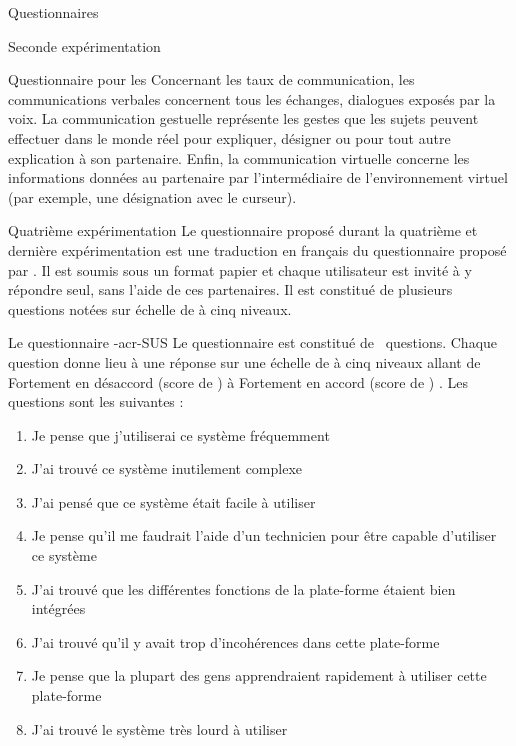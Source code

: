 \documentclass[myfrancais]{mythesis}
\begin{document}
\begin{mychapter}{Questionnaires}
\begin{mysection}{Seconde expérimentation}
\begin{mysubsection}{Questionnaire pour les }
				Concernant les taux de communication, les communications verbales concernent tous les échanges, dialogues exposés par la voix.
				La communication gestuelle représente les gestes que les sujets peuvent effectuer dans le monde réel pour expliquer, désigner ou pour tout autre explication à son partenaire.
				Enfin, la communication virtuelle concerne les informations données au partenaire par l'intermédiaire de l'environnement virtuel (par exemple, une désignation avec le curseur).
			\end{mysubsection}
		\end{mysection}
		\begin{mysection}{Quatrième expérimentation}
			Le questionnaire proposé durant la quatrième et dernière expérimentation est une traduction en français du questionnaire  proposé par .
			Il est soumis sous un format papier et chaque utilisateur est invité à y répondre seul, sans l'aide de ces partenaires.
			Il est constitué de plusieurs questions notées sur échelle de  à cinq niveaux.
			\begin{mysubsection}{Le questionnaire \myacronl-{acr-SUS}}
				Le questionnaire  est constitué de ~questions.
				Chaque question donne lieu à une réponse sur une échelle de  à cinq niveaux allant de \og Fortement en désaccord (score de ) \fg à \og Fortement en accord (score de ) \fg.
				Les questions sont les suivantes :
				\begin{enumerate}[label={Q\arabic*.},ref={Q\arabic*}]
					\item Je pense que j'utiliserai ce système fréquemment
					\item J'ai trouvé ce système inutilement complexe
					\item J'ai pensé que ce système était facile à utiliser
					\item Je pense qu'il me faudrait l'aide d'un technicien pour être capable d'utiliser ce système
					\item J'ai trouvé que les différentes fonctions de la plate-forme étaient bien intégrées
					\item J'ai trouvé qu'il y avait trop d'incohérences dans cette plate-forme
					\item Je pense que la plupart des gens apprendraient rapidement à utiliser cette plate-forme
					\item J'ai trouvé le système très lourd à utiliser

\end{enumerate}
\end{mysubsection}
\end{mysection}
\end{mychapter}
\end{document}
